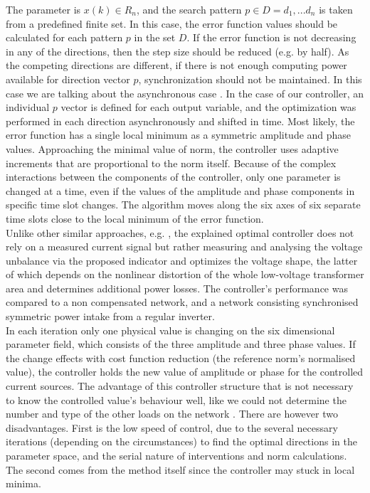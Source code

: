        The parameter is  $x(k)\in R_n$, and the search pattern $p\in D={d_1,...d_n}$ is taken from a predefined finite set. In this case, the error function values should be calculated for each pattern $p$ in the set $D$. If the error function is not decreasing in any of the directions, then the step size should be reduced (e.g. by half). As the competing directions are different, if there is not enough computing power available for direction vector $p$, synchronization should not be maintained. In this case we are talking about the asynchronous case . In the case of our controller, an individual $p$ vector is defined for each output variable, and the optimization was performed in each direction asynchronously and shifted in time. Most likely, the error function has a single local minimum as a symmetric amplitude and phase values. Approaching the minimal value of norm, the controller uses adaptive increments that are proportional to the norm itself. Because of the complex interactions between the components of the controller, only one parameter is changed at a time, even if the values of the amplitude and phase components in specific time slot changes. The algorithm moves along the six axes of six separate time slots close to the local minimum of the error function.\\
        Unlike other similar approaches, e.g. \cite{segui2007approach}, the explained optimal controller does not rely on a measured current signal but rather measuring and analysing the voltage unbalance via the proposed indicator and optimizes the voltage shape, the latter of which depends on the nonlinear distortion of the whole low-voltage transformer area and determines additional power losses. The controller's performance was compared to a non compensated network, and a network consisting synchronised symmetric power intake from a regular inverter.\\
        In each iteration only one physical value is changing on the six dimensional parameter field, which consists of the three amplitude and three phase values. If the change effects with cost function reduction (the reference norm's normalised value), the controller holds the new value of amplitude or phase for the controlled current sources. The advantage of this controller structure that is not necessary to know the controlled value's behaviour well, like we could not determine the number and type of the other loads on the network \cite{Neukirchner2015}. There are however two disadvantages. First is the low speed of control, due to the several necessary iterations (depending on the circumstances) to find the optimal directions in the parameter space, and the serial nature of interventions and norm calculations. The second comes from the method itself since the controller may stuck in local minima.

